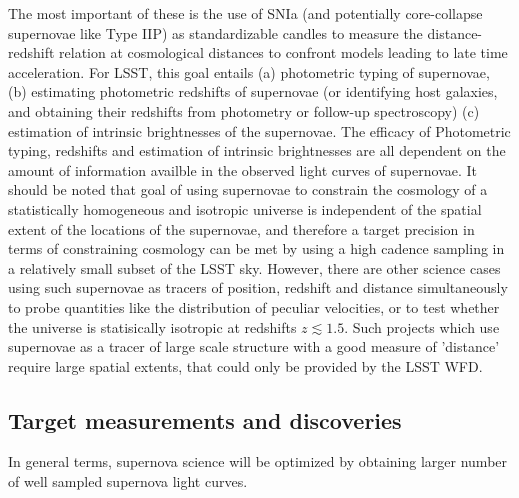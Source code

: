 The most important of these is the use of SNIa (and potentially core-collapse
supernovae like Type IIP) as standardizable candles to measure the 
distance-redshift relation at cosmological distances to confront models leading to late time
 acceleration. For LSST, this goal entails (a) photometric typing of supernovae,
 (b) estimating photometric redshifts of supernovae (or identifying host galaxies,
 and obtaining their redshifts from photometry or follow-up spectroscopy)
(c) estimation of intrinsic brightnesses of the supernovae. The efficacy of 
Photometric typing, redshifts and estimation of intrinsic brightnesses are all
dependent on the amount of information availble in the observed light curves of supernovae.
 It should be noted that goal of using supernovae to constrain the 
cosmology of a statistically homogeneous and isotropic universe is independent
of the spatial extent of the locations of the supernovae, and therefore a target
 precision in terms of constraining cosmology can be met by using a high cadence sampling
 in a relatively small subset of the LSST sky. However, there are other science cases
using such supernovae as tracers of position, redshift and distance simultaneously to probe
 quantities like the distribution of peculiar velocities, or to test whether the universe is
statisically isotropic at redshifts $z \lesssim 1.5$. Such projects which use supernovae as a tracer
of large scale structure with a good measure of 'distance' require large spatial extents, that could 
only be provided by the LSST WFD.



\subsection{Target measurements and discoveries}
\label{sec:keyword:targets}




In general terms, supernova science will be optimized by obtaining larger number of well sampled 
supernova light curves.




